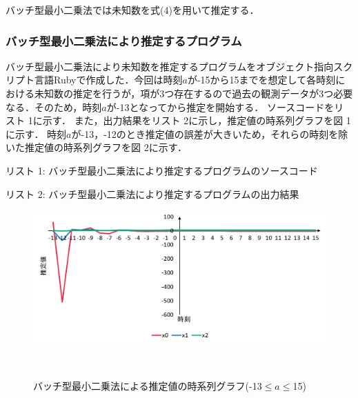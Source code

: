 \documentclass[a4paper]{jarticle}
\begin{document}
バッチ型最小二乗法では未知数を式(4)を用いて推定する．


\newpage
\subsubsection{バッチ型最小二乗法により推定するプログラム}
バッチ型最小二乗法により未知数を推定するプログラムをオブジェクト指向スクリプト言語Rubyで作成した．今回は時刻$a$が-15から15までを想定して各時刻における未知数の推定を行うが，項が3つ存在するので過去の観測データが3つ必要なる．そのため，時刻$a$が-13となってから推定を開始する．
ソースコードをリスト 1に示す．
また，出力結果をリスト 2に示し，推定値の時系列グラフを図 1に示す．
時刻$a$が-13，-12のとき推定値の誤差が大きいため，それらの時刻を除いた推定値の時系列グラフを図 2に示す．

\vspace{3mm}
\begin{center}
リスト 1: バッチ型最小二乗法により推定するプログラムのソースコード
\begin{small}
\vspace{1mm}
\end{small}
\vspace{3mm}
\end{center}

\begin{center}
リスト 2: バッチ型最小二乗法により推定するプログラムの出力結果
\begin{small}
\vspace{1mm}
\end{small}
\end{center}
\clearpage
\begin{figure}[!h]
  \centering
  \includegraphics[width=16cm]{batch1.png}
  \caption{バッチ型最小二乗法による推定値の時系列グラフ(-13$\le a \le $15)}
　\label{graph}
\end{figure}
\end{document}
